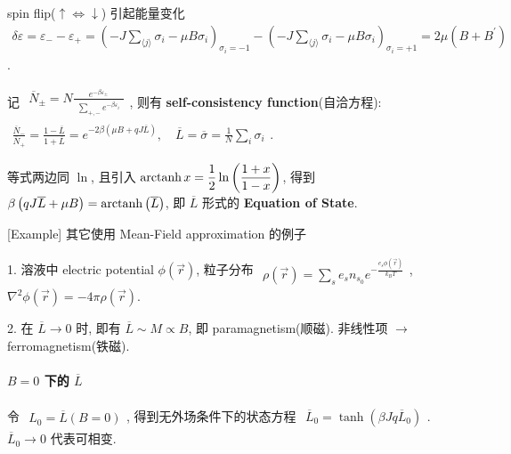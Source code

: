 \documentclass[../../main.tex]{subfiles}
\begin{document}
spin flip($\uparrow\Leftrightarrow\downarrow$) 引起能量变化 $\begin{aligned}
    \delta\varepsilon 
    = \varepsilon_{-} - \varepsilon_{+} 
    = \left(-J\sum_{\langle j\rangle}\sigma_{i}-\mu B\sigma_{i}\right)_{\sigma_{i}=-1} - \left(-J\sum_{\langle j\rangle}\sigma_{i}-\mu B\sigma_{i}\right)_{\sigma_{i}=+1} = 2\mu(B+B^{\prime})
\end{aligned}$. 

记 $\begin{aligned}
    \overline{N}_{\pm} = N\frac{e^{-\beta\varepsilon_{\pm}}}{\begin{aligned}
        \sum_{+,-}e^{-\beta \varepsilon_{i}}
    \end{aligned}}
\end{aligned}$, 则有 \textbf{self-consistency function}(自洽方程): $\begin{aligned}
    \frac{\overline{N}_{-}}{\overline{N}_{+}} = \frac{1-\overline{L}}{1+\overline{L}} = e^{-2\beta(\mu B + qJ\overline{L})},\quad \overline{L} = \overline{\sigma} = \frac{1}{N}\sum_{i}\sigma_{i}
\end{aligned}$. 

等式两边同 $\ln$, 且引入 $\begin{aligned}
    \operatorname{arctanh}{x} = \frac{1}{2}\ln{\left(\frac{1+x}{1-x}\right)}
\end{aligned}$, 得到 $\begin{aligned}
    \beta\left(qJ\overline{L}+\mu B\right) = \operatorname{arctanh}{\left(\overline{L}\right)}
\end{aligned}$, 即 $\overline{L}$ 形式的 \textbf{Equation of State}. 

[Example] 其它使用 Mean-Field approximation 的例子

1. 溶液中 electric potential $\phi(\vec{r})$, 粒子分布 $\begin{aligned}
    \rho(\vec{r}) = \sum_{s}e_{s}n_{s_{0}}e^{-\frac{e_{s}\phi(\vec{r})}{k_{B}T}}
\end{aligned}$, $\nabla^{2}\phi(\vec{r}) = -4\pi\rho(\vec{r})$. 

2. 在 $\overline{L}\rightarrow 0$ 时, 即有 $\overline{L}\sim M \propto B$, 即 paramagnetism(顺磁). 非线性项 $\rightarrow$ ferromagnetism(铁磁). 

\paragraph{$B = 0$ 下的 $\overline{L}$} 

令 $\begin{aligned}
    L_{0} = \overline{L}(B=0)
\end{aligned}$, 得到无外场条件下的状态方程 $\begin{aligned}
    \overline{L}_{0} = \tanh{(\beta Jq\overline{L}_{0})}
\end{aligned}$. $\overline{L}_{0}\rightarrow 0$ 代表可相变. 
\end{document}
